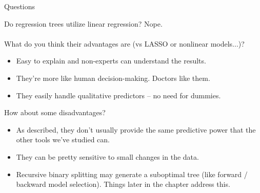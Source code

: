 \documentclass[mathserif, aspectratio=169]{beamer}
\begin{document}
\begin{frame}{Questions}

Do regression trees utilize linear regression? \pause Nope.  \\~\\

What do you think their advantages are (vs LASSO or nonlinear models...)? \pause

\begin{itemize}
\item Easy to explain and non-experts can understand the results.
\item They're more like human decision-making.  Doctors like them.
\item They easily handle qualitative predictors -- no need for dummies.
\end{itemize}

\pause How about some disadvantages? \pause

\begin{itemize}
\item As described, they don't usually provide the same predictive power that the other tools we've studied can.
\item They can be pretty sensitive to small changes in the data. 
\item Recursive binary splitting may generate a suboptimal tree (like forward / backward model selection).  Things later in the chapter address this.
\end{itemize}
\end{frame}
\end{document}
